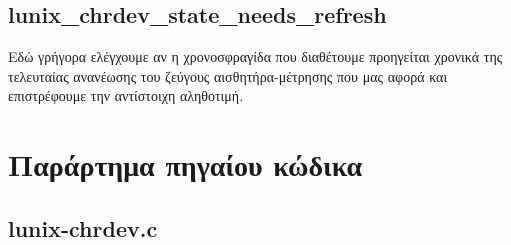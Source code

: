 \documentclass[12pt,titlepage]{article}
\begin{document}
\subsection{\textlatin{lunix\_chrdev\_state\_needs\_refresh}}

Εδώ γρήγορα ελέγχουμε αν η χρονοσφραγίδα που διαθέτουμε προηγείται χρονικά της τελευταίας ανανέωσης του ζεύγους αισθητήρα-μέτρησης που μας αφορά και επιστρέφουμε την αντίστοιχη αληθοτιμή.

\section{Παράρτημα πηγαίου κώδικα}

\subsection{\textlatin{lunix-chrdev.c}}

\latintext



\greektext
\end{document}
